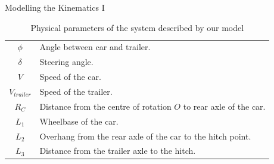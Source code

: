 \begin{frame}{Modelling the Kinematics I}
\begin{minipage}{0.6\textwidth}
\begin{table}[H]
\begin{tabularx}{0.95\textwidth}{c X}
            $\phi$        & Angle between car and trailer. \\
            $\delta$      & Steering angle. \\
            $V$           & Speed of the car. \\
            $V_{trailer}$ & Speed of the trailer. \\
            $R_{C}$       & Distance from the centre of rotation $O$ to rear axle of the car. \\
            $L_{1}$       & Wheelbase of the car. \\
            $L_{2}$       & Overhang from the rear axle of the car to the hitch point. \\ 
            $L_{3}$       & Distance from the trailer axle to the hitch. \\ 
            \bottomrule
        \end{tabularx}
        \caption{Physical parameters of the system described by our model}
        \label{tab:parameters}
    \end{table}
\end{minipage}
\end{frame}

